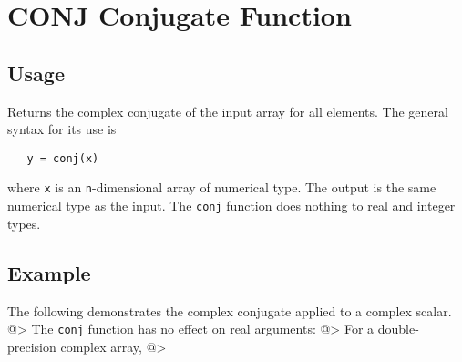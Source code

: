 \section{CONJ Conjugate Function}

\subsection{Usage}

Returns the complex conjugate of the input array for all elements.  The 
general syntax for its use is
\begin{verbatim}
   y = conj(x)
\end{verbatim}
where \verb|x| is an \verb|n|-dimensional array of numerical type.  The output 
is the same numerical type as the input.  The \verb|conj| function does
nothing to real and integer types.
\subsection{Example}

The following demonstrates the complex conjugate applied to a complex scalar.
@>
The \verb|conj| function has no effect on real arguments:
@>
For a double-precision complex array,
@>
